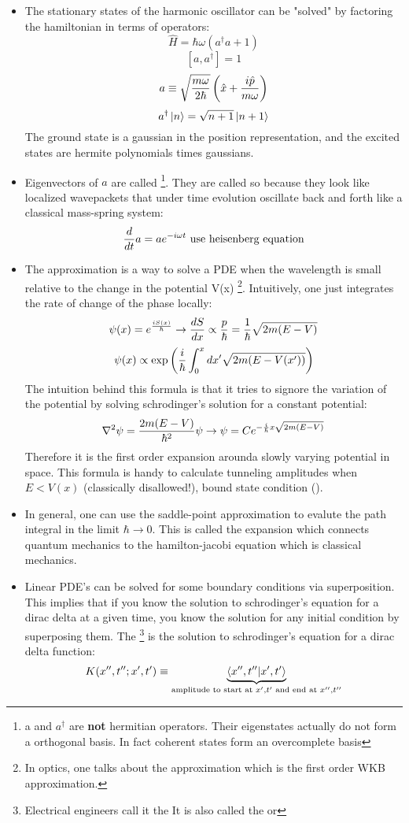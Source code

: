 \documentclass[10pt]{scrartcl}
\begin{document}
\begin{itemize}
	\item The stationary states of the harmonic oscillator can be "solved" by factoring the hamiltonian in terms of  operators:
	\[\hat{H} = \hbar \omega \left(a^\dagger a + 1 \right)\]
	\[[a, a^\dagger] = 1\]
	\[a \equiv \sqrt{m \omega \over 2 \hbar} \left( \hat{x} + {i \hat{p} \over m \omega} \right) \]
	\[a^\dagger \ket{n} = \sqrt{n+1} \ket{n+1} \]
	The ground state is a gaussian in the position representation, and the excited states are hermite polynomials times gaussians.
	\item Eigenvectors of $a$ are called  \footnote{a and $a^\dagger$ are \textbf{not} hermitian operators.  Their eigenstates actually do not form a orthogonal basis.  In fact coherent states form an overcomplete basis}.  They are called so because they look like localized wavepackets that under time evolution oscillate back and forth like a classical mass-spring system:
	\[{d \over dt} a = a e^{-i \omega t} \text{ use heisenberg equation} \]
	
	\item The  approximation is a way to solve a PDE when the wavelength is small relative to the change in the potential V(x) \footnote{In optics, one talks about the  approximation which is the first order WKB approximation.}.  Intuitively, one just integrates the rate of change of the phase locally:
	\[\psi(x) = e^{i S(x) \over \hbar} \rightarrow {d S \over dx} \propto {p \over \hbar} = {1 \over \hbar } \sqrt{2 m (E-V)} \]
	\[\psi(x) \propto \exp \left( {i \over \hbar} \int_0^x dx' \sqrt{2 m (E - V(x'))}  \right) \]
	The intuition behind this formula is that it tries to signore the variation of the potential by solving schrodinger's solution for a constant potential:
	\[\nabla^2 \psi = {2m (E - V) \over \hbar^2} \psi \rightarrow \psi = C e^{-{i \over \hbar} x \sqrt{2m (E-V)}} \]
	Therefore it is the first order expansion arounda  slowly varying potential in space.
	This formula is handy to calculate tunneling amplitudes when $E < V(x)$ (classically disallowed!), bound state condition ().  
	\item In general, one can use the saddle-point approximation to evalute the path integral in the limit $\hbar \rightarrow 0$.  This is called the  expansion which connects quantum mechanics to the hamilton-jacobi equation which is classical mechanics. 
	\item Linear PDE's can be solved for some boundary conditions via superposition. This implies that if you know the solution to schrodinger's equation for a dirac delta at a given time, you know the solution for any initial condition by superposing them.  The  \footnote{Electrical engineers call it the   It is also called the  or } is the solution to schrodinger's equation for a dirac delta function:
	\[  K(x'', t''; x', t') \equiv \underbrace{\braket{x'', t'' | x', t'}}_{\text{amplitude to start at } x', t' \text{ and end at } x'', t''}  \]
	

\end{itemize}
\end{document}
